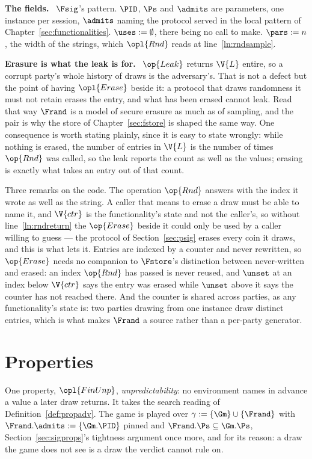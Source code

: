 \documentclass[10pt,oneside,openany]{book}
\newcommand{\heading}[1]{\medskip\par\noindent\textcolor{accent}{\textbf{#1.}}\ }
\theoremstyle{accentdef}
\theoremstyle{accentplain}
\begin{document}
\heading{The fields} $\Fsig$'s pattern. $\PID$, $\Ps$ and $\admits$ are parameters, one instance
per session, $\admits$ naming the protocol served in the local pattern of
Chapter~\ref{sec:functionalities}. $\uses := \emptyset$, there being no call to make.
$\pars := n$, the width of the strings, which $\opl{Rnd}$ reads at line~\ref{ln:rndsample}.

\heading{Erasure is what the leak is for} $\op{Leak}$ returns $\V{L}$ entire, so a corrupt party's
whole history of draws is the adversary's. That is not a defect but the point of having
$\opl{Erase}$ beside it: a protocol that draws randomness it must not retain erases the entry, and
what has been erased cannot leak. Read that way $\Frand$ is a model of secure erasure as much as
of sampling, and the pair is why the store of Chapter~\ref{sec:fstore} is shaped the same way.
One consequence is worth stating plainly, since it is easy to state wrongly: while nothing is
erased, the number of entries in $\V{L}$ is the number of times $\op{Rnd}$ was called, so the leak
reports the count as well as the values; erasing is exactly what takes an entry out of that count.



Three remarks on the code. The operation $\op{Rnd}$ answers with the index it wrote as well as the string. A
caller that means to erase a draw must be able to name it, and $\V{ctr}$ is the functionality's
state and not the caller's, so without line~\ref{ln:rndreturn} the $\op{Erase}$ beside it could
only be used by a caller willing to guess --- the protocol of Section~\ref{sec:psig} erases every
coin it draws, and this is what lets it. Entries are indexed by a counter and never rewritten, so $\op{Erase}$
needs no companion to $\Fstore$'s distinction between never-written and erased: an index
$\op{Rnd}$ has passed is never reused, and $\unset$ at an index below $\V{ctr}$ says the entry was
erased while $\unset$ above it says the counter has not reached there. And the counter is shared
across parties, as any functionality's state is: two parties drawing from one instance draw
distinct entries, which is what makes $\Frand$ a source rather than a per-party generator.

\section{Properties}\label{sec:randprops}

One property, $\opl{FinUnp}$, \emph{unpredictability}: no environment names in advance a value a
later draw returns. It takes the search reading of Definition~\ref{def:propadv}. The game is
played over $\gamma := \{\Gm\} \cup \{\Frand\}$ with $\Frand.\admits := \{\Gm.\PID\}$ pinned and
$\Frand.\Ps \subseteq \Gm.\Ps$, Section~\ref{sec:sigprops}'s tightness argument once more, and
for its reason: a draw the game does not see is a draw the verdict cannot rule on.
\end{document}

